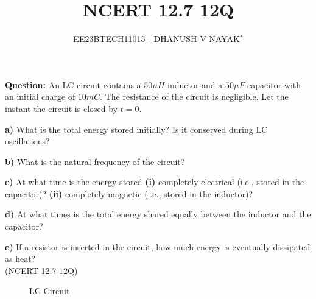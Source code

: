 \documentclass[journal,12pt,twocolumn]{IEEEtran}
\theoremstyle{remark}
\begin{document}

\vspace{3cm}
\title{NCERT 12.7 12Q}
\author{EE23BTECH11015 - DHANUSH V NAYAK$^{*}$%
}
\maketitle
\newpage
\bigskip
\renewcommand{\thefigure}{\arabic{figure}}
\renewcommand{\thetable}{\theenumi}


\textbf{Question:} An LC circuit contains a $50 \mu H$ inductor and a $50 \mu F$ capacitor with an initial charge of $10 mC$. The resistance of the circuit is negligible. Let the instant the circuit is closed by $t = 0$.

\textbf{a)} What is the total energy stored initially? Is it conserved during LC oscillations?

\textbf{b)} What is the natural frequency of the circuit?

\textbf{c)} At what time is the energy stored \textbf{(i)} completely electrical (i.e., stored in the capacitor)? \textbf{(ii)} completely magnetic (i.e., stored in the inductor)?

\textbf{d)} At what times is the total energy shared equally between the inductor and the capacitor?

\textbf{e)} If a resistor is inserted in the circuit, how much energy is eventually dissipated as heat? \\
\hfill(NCERT 12.7 12Q)\\
\solution


\begin{figure}[H]
    \centering
    \resizebox{0.2\textwidth}{!}{}
    \caption{LC Circuit}
    \label{fig:ncert_12.7.12_cktdiag}
\end{figure}
\end{document}

